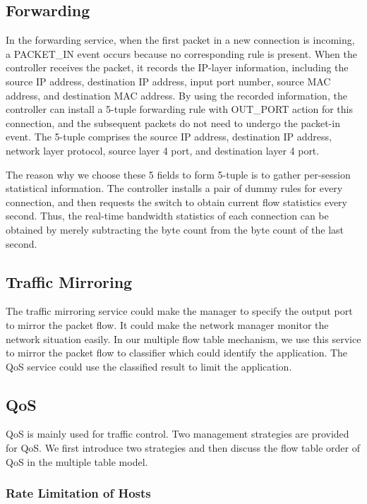 \subsection{Forwarding} \label{ssec:forwarding}
In the forwarding service, when the first packet in a new connection is incoming, a PACKET\_IN event occurs because no corresponding rule is present. When the controller receives the packet, it records the IP-layer information, including the source IP address, destination IP address, input port number, source MAC address, and destination MAC address. By using the recorded information, the controller can install a 5-tuple forwarding rule with OUT\_PORT action for this connection, and the subsequent packets do not need to undergo the packet-in event. The 5-tuple comprises the source IP address, destination IP address, network layer protocol, source layer 4 port, and destination layer 4 port.

The reason why we choose these 5 fields to form 5-tuple is to gather per-session statistical information. The controller installs a pair of dummy rules for every connection, and then requests the switch to obtain current flow statistics every second. Thus, the real-time bandwidth statistics of each connection can be obtained by merely subtracting the byte count from the byte count of the last second.


\subsection{Traffic Mirroring} \label{ssec:mirror}
The traffic mirroring service could make the manager to specify the output port to mirror the packet flow.
It could make the network manager monitor the network situation easily.
In our multiple flow table mechanism, we use this service to mirror the packet flow to classifier which could identify the application.
The QoS service could use the classified result to limit the application.


\subsection{QoS}
QoS is mainly used for traffic control. Two management strategies are provided for QoS. We first introduce two strategies and then discuss the flow table order of QoS in the multiple table model.

\subsubsection{Rate Limitation of Hosts}

